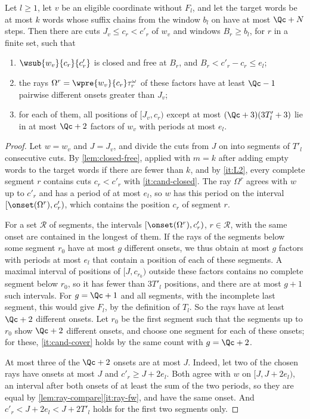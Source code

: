 \begin{lemma}[Candidates]\label{lem:candidates}
Let $l\ge1$, let $v$ be an eligible coordinate without $F_l$, and let the
target words be at most $k$ words whose suffix chains from the window $b_l$ on
have at most $\Qc+N$ steps. Then there are cuts $J_v\le c_r<c'_r$ of $w_v$ and
windows $B_r\ge b_l$, for $r$ in a finite set, such that
\begin{enumerate}
\item\label{it:cand-closed} $\wsub{w_v}{c_r}{c'_r}$ is closed and free at
  $B_r$, and $B_r<c'_r-c_r\le e_l$;
\item\label{it:cand-many} the rays $\Omega^r=\wpre{w_v}{c_r}\tau_r^\omega$
  of these factors have at least $\Qc-1$ pairwise different onsets greater
  than $J_v$;
\item\label{it:cand-cover} for each of them, all positions of
  $[J_v,c_r)$ except at most $(\Qc+3)(3T'_l+3)$ lie in at most $\Qc+2$ factors
  of $w_v$ with periods at most $e_l$.
\end{enumerate}
\end{lemma}

\begin{proof}
Let $w=w_v$ and $J=J_v$, and divide the cuts from $J$ on into
segments of $T'_l$ consecutive cuts. By \cref{lem:closed-free}, applied
with $m=k$ after adding empty words to the target words if there are fewer than
$k$, and by \ref{it:L2}, every complete segment $r$ contains cuts
$c_r<c'_r$ with \eqref{it:cand-closed}. The ray $\Omega^r$ agrees with $w$ up to $c'_r$ and
has a period of at most $e_l$, so $w$ has this period on the interval
$[\onset(\Omega^r),c'_r)$, which contains the position $c_r$ of segment $r$.

For a set $\mathcal R$ of segments, the intervals
$[\onset(\Omega^r),c'_r)$, $r\in\mathcal R$, with the same onset are
contained in the longest of them. If the rays of the segments below some
segment $r_0$ have at most $g$ different onsets, we thus obtain at most $g$
factors with periods at most $e_l$ that contain a position of each of these
segments. A maximal interval of positions of $[J,c_{r_0})$ outside these
factors contains no complete segment below $r_0$, so it has fewer than
$3T'_l$ positions, and there are at most $g+1$ such intervals. For
$g=\Qc+1$ and all segments, with the incomplete last segment, this would give
$F_l$, by the definition of $T_l$. So the rays have at least $\Qc+2$ different
onsets. Let $r_0$ be the first segment such that the segments up to $r_0$
show $\Qc+2$ different onsets, and choose one segment for each of these
onsets; for these, \eqref{it:cand-cover} holds by the same count with
$g=\Qc+2$.

At most three of the $\Qc+2$ onsets are at most $J$. Indeed, let two of the
chosen rays have onsets at most $J$ and $c'_r\ge J+2e_l$. Both agree with
$w$ on $[J,J+2e_l)$, an interval after both onsets of at least the sum of
the two periods, so they are equal by
\cref{lem:ray-compare}\eqref{it:ray-fw}, and have the same onset. And
$c'_r<J+2e_l<J+2T'_l$ holds for the first two segments only.
\end{proof}

